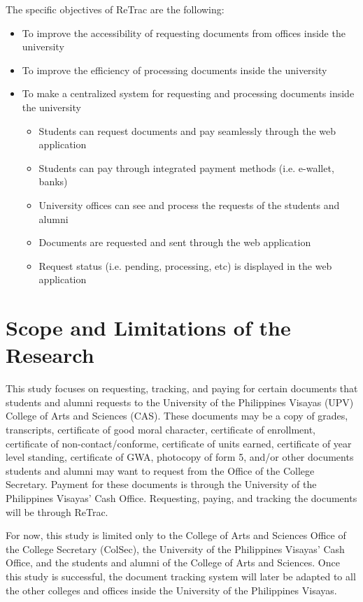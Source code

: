 The specific objectives of ReTrac are the following:
\begin{itemize}
    \item To improve the accessibility of requesting documents from offices inside the university
    \item To improve the efficiency of processing documents inside the university
    \item To make a centralized system for requesting and processing documents inside the university
    \begin{itemize}
        \item Students can request documents and pay seamlessly through the web application
        \item Students can pay through integrated payment methods (i.e. e-wallet, banks)
        \item University offices can see and process the requests of the students and alumni
        \item Documents are requested and sent through the web application
        \item Request status (i.e. pending, processing, etc) is displayed in the web application
    \end{itemize}
    \vfill
\end{itemize}


\section{Scope and Limitations of the Research}
\label{sec:scopelimitations}

This study focuses on requesting, tracking, and paying for certain documents that students and alumni requests to the University of the Philippines Visayas (UPV) College of Arts and Sciences (CAS). These documents may be a copy of grades, transcripts, certificate of good moral character, certificate of enrollment, certificate of non-contact/conforme, certificate of units earned, certificate of year level standing, certificate of GWA, photocopy of form 5, and/or other documents students and alumni may want to request from the Office of the College Secretary. Payment for these documents is through the University of the Philippines Visayas’ Cash Office. Requesting, paying, and tracking the documents will be through ReTrac.

For now, this study is limited only to the College of Arts and Sciences Office of the College Secretary (ColSec), the University of the Philippines Visayas’ Cash Office, and the students and alumni of the College of Arts and Sciences. Once this study is successful, the document tracking system will later be adapted to all the other colleges and offices inside the University of the Philippines Visayas. 



